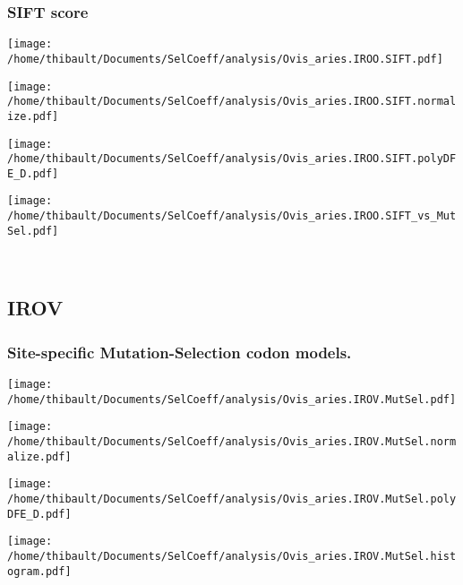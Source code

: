 \subsubsection*{SIFT score} 
\begin{minipage}{0.49\linewidth} 
\texttt{[image: /home/thibault/Documents/SelCoeff/analysis/Ovis\_aries.IROO.SIFT.pdf]} 
\end{minipage}
\begin{minipage}{0.49\linewidth} 
\texttt{[image: /home/thibault/Documents/SelCoeff/analysis/Ovis\_aries.IROO.SIFT.normalize.pdf]} 
\end{minipage}
\begin{minipage}{0.49\linewidth} 
\texttt{[image: /home/thibault/Documents/SelCoeff/analysis/Ovis\_aries.IROO.SIFT.polyDFE\_D.pdf]} 
\end{minipage}
\begin{minipage}{0.49\linewidth} 
\texttt{[image: /home/thibault/Documents/SelCoeff/analysis/Ovis\_aries.IROO.SIFT\_vs\_MutSel.pdf]} 
\end{minipage}
\\ 
\subsection{IROV} 
 
\subsubsection*{Site-specific Mutation-Selection codon models.} 
\begin{minipage}{0.49\linewidth} 
\texttt{[image: /home/thibault/Documents/SelCoeff/analysis/Ovis\_aries.IROV.MutSel.pdf]} 
\end{minipage}
\begin{minipage}{0.49\linewidth} 
\texttt{[image: /home/thibault/Documents/SelCoeff/analysis/Ovis\_aries.IROV.MutSel.normalize.pdf]} 
\end{minipage}
\begin{minipage}{0.49\linewidth} 
\texttt{[image: /home/thibault/Documents/SelCoeff/analysis/Ovis\_aries.IROV.MutSel.polyDFE\_D.pdf]} 
\end{minipage}
\begin{minipage}{0.49\linewidth} 
\texttt{[image: /home/thibault/Documents/SelCoeff/analysis/Ovis\_aries.IROV.MutSel.histogram.pdf]} 
\end{minipage}
\\ 
